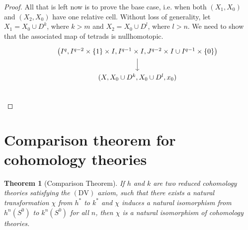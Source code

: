 \documentclass[12pt, notitlepage]{article}
\newtheorem{thm}{Theorem}[section]
\theoremstyle{definition}
\begin{document}
\begin{proof}
    All that is left now is to prove the base case, i.e. when both $(X_1, X_0)$ and $(X_2, X_0)$
    have one relative cell. Without loss of generality, let $X_1 = X_0 \cup D^k$, where $k > m$ and
    $X_2 = X_0 \cup D^l$, where $l > n$. We need to show that the associated map of tetrads is
    nullhomotopic.
    \[
      \begin{tikzcd}
        &\left( I^q, I^{q-2} \times \{1\} \times I, I^{q-1} \times I, J^{q-2} \times I \cup I^{q-1} \times \{0\} \right) \ar[d] \\
        &(X, X_0 \cup D^k, X_0 \cup D^l, x_0) \\
      \end{tikzcd}
    \]

  \end{proof}
  
  \section{Comparison theorem for cohomology theories}
  \label{sec:comp-theor-cohom}

\begin{thm}[Comparison Theorem]
  If $h$ and $k$ are two reduced cohomology theories satisfying the $(\mathrm{DV})$ axiom, such that
  there exists a natural transformation $\chi$ from $h^{\ast}$ to $k^{\ast}$ and $\chi$ induces a
  natural isomorphism from $h^n(S^0)$ to $k^n(S^0)$ for all $n$, then $\chi$ is a natural
  isomorphism of cohomology theories.
\end{thm}
\end{document}
